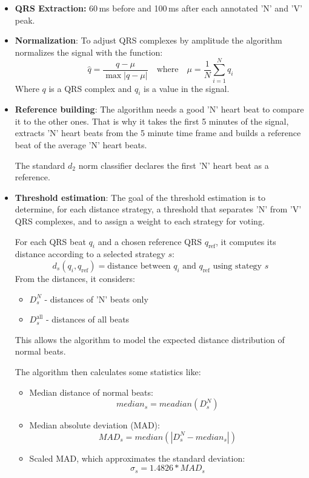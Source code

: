 \documentclass[conference]{IEEEtran}
\begin{document}
\begin{itemize}
    \item \textbf{QRS Extraction:} 60\,ms before and 100\,ms after each annotated 'N' and 'V' peak.
    
    \item \textbf{Normalization}: To adjust QRS complexes by amplitude the algorithm normalizes the signal with the function:
    \[
        \hat{q} =
        \frac{q - \mu}
        {\max \left|q - \mu \right|}
        \quad \text{where} \quad
        \mu = \frac{1}{N}\sum_{i=1}^{N} q_i
    \]
    Where $q$ is a QRS complex and $q_i$ is a value in the signal.
    
    \item \textbf{Reference building}: The algorithm needs a good 'N' heart beat to compare it to the other ones. That is why it takes the first 5 minutes of the signal, extracts 'N' heart beats from the 5 minute time frame and builds a reference beat of the average 'N' heart beats.

    The standard $d_2$ norm classifier declares the first 'N' heart beat as a reference. 
    
    \item \textbf{Threshold estimation}: The goal of the threshold estimation is to determine, for each distance strategy, a threshold that separates 'N' from 'V' QRS complexes, and to assign a weight to each strategy for voting.

    For each QRS beat $q_i$ and a chosen reference QRS $q_\text{ref}$, it computes its distance according to a selected strategy $s$:
    \[
        d_s(q_i,q_\text{ref}) = \text{distance between $q_i$ and $q_\text{ref}$ using stategy $s$} 
    \]
    From the distances, it considers:
    \begin{itemize}
        \item $D_s^N$ - distances of 'N' beats only
        \item $D_s^\text{all}$ - distances of all beats
    \end{itemize}
    This allows the algorithm to model the expected distance distribution of normal beats.

    The algorithm then calculates some statistics like:
    \begin{itemize}
        \item Median distance of normal beats:
        \[
            median_s = meadian(D_s^N)
        \]
        \item Median absolute deviation (MAD):
        \[
            MAD_s = median(|D_s^N - median_s|)  
        \]
        \item Scaled MAD, which approximates the standard deviation:
        \[
            \sigma_s = 1.4826 * MAD_s
        \]
    \end{itemize}


\end{itemize}
\end{document}
